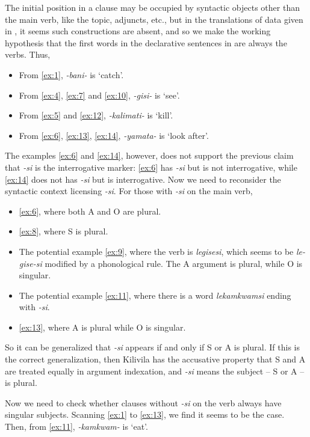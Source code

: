 \documentclass{article}
\newcommand*{\corpus}[1]{\emph{#1}}
\newcommand{\translate}[1]{`#1'}
\begin{document}
The initial position in a clause may be occupied by syntactic objects other than the main verb,
like the topic, adjuncts, etc., 
but in the translations of data given in ,
it seems such constructions are absent, 
and so we make the working hypothesis that 
the first words in the declarative sentences in  are always the verbs.
Thus, 
\begin{itemize}
    \item From \eqref{ex:1}, \corpus{-bani-} is \translate{catch}.
    \item From \eqref{ex:4}, \eqref{ex:7} and \eqref{ex:10}, \corpus{-gisi-} is \translate{see}.
    \item From \eqref{ex:5} and \eqref{ex:12}, \corpus{-kalimati-} is \translate{kill}.
    \item From \eqref{ex:6}, \eqref{ex:13}, \eqref{ex:14}, \corpus{-yamata-} is \translate{look after}.
\end{itemize}
The examples \eqref{ex:6} and \eqref{ex:14}, however, does not support the previous claim that 
\corpus{-si} is the interrogative marker:
\eqref{ex:6} has \corpus{-si} but is not interrogative,
while \eqref{ex:14} does not has \corpus{-si} but is interrogative.
Now we need to reconsider the syntactic context licensing \corpus{-si}.
For those with \corpus{-si} on the main verb,
\begin{itemize}
    \item \eqref{ex:6}, where both A and O are plural.
    \item \eqref{ex:8}, where S is plural.
    \item The potential example \eqref{ex:9}, where the verb is \corpus{legisesi}, 
    which seems to be \corpus{le-gise-si} modified by a phonological rule.
    The A argument is plural, while O is singular.
    \item The potential example \eqref{ex:11}, 
    where there is a word \corpus{lekamkwamsi} ending with \corpus{-si}.
    \item \eqref{ex:13}, where A is plural while O is singular.
\end{itemize}
So it can be generalized that \corpus{-si} appears if and only if S or A is plural.
If this is the correct generalization,
then Kilivila has the accusative property that S and A are treated equally in argument indexation, 
and \corpus{-si} means the subject -- S or A -- is plural.

Now we need to check whether clauses without \corpus{-si} on the verb 
always have singular subjects.
Scanning \eqref{ex:1} to \eqref{ex:13}, we find it seems to be the case. 
Then, from \eqref{ex:11}, \corpus{-kamkwam-} is \translate{eat}.
\end{document}
